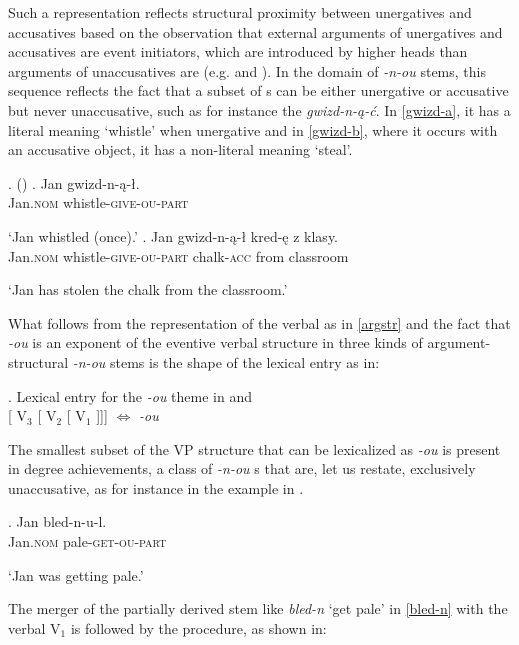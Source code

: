 Such a representation reflects structural proximity between unergatives and accusatives based on the observation that external arguments of unergatives and accusatives  are event initiators, which are introduced by higher heads than arguments of unaccusatives are (e.g. \citealt{LevinandRapp1995} and \citealt{Ramchand08}). In the domain of \textit{-n-ou} stems, this sequence reflects the fact that a subset of s can be either unergative or accusative but never unaccusative, such as for instance the  \textit{gwizd-n-\k{a}-\'c}. In \ref{gwizd-a}, it has a literal meaning `whistle' when unergative and in \ref{gwizd-b}, where it occurs with an accusative object, it has a non-literal meaning `steal'.

\ex.  (\citealt[ex. 89]{NU})
\ag. Jan gwizd-n-\k{a}-\l.\\
Jan.\textsc{nom} whistle-\textsc{give}-\textsc{ou}-\textsc{part}\\
\strut `Jan whistled (once).'\label{gwizd-a}
\bg. Jan {gwizd-n-\k{a}-\l}  kred-\k{e} z klasy.\\
Jan.\textsc{nom} {whistle-\textsc{give}-\textsc{ou}-\textsc{part}}  chalk-\textsc{acc} from classroom\\
\strut `Jan has stolen the chalk from the classroom.'\label{gwizd-b}

What follows from the representation of the verbal  as in \ref{argstr} and the fact that \textit{-ou} is an exponent of the eventive verbal structure in three kinds of argument-structural \textit{-n-ou} stems is the shape of the lexical entry as in:

\ex. Lexical entry for the \textit{-ou} theme in  and \label{lex:ou}\\[0.5ex]
[ V$_{3}$ [ V$_{2}$ [ V$_{1}$ ]]]  $\Leftrightarrow$ \textit{-ou}

\noindent
The smallest subset of the VP structure that can be lexicalized as \textit{-ou} is present in degree achievements, a class of \textit{-n-ou} s that are, let us restate, exclusively unaccusative, as for instance in the  example in \Next.

\exg. 
Jan bled-n-u-l.\\
Jan.\textsc{nom} pale-\textsc{get}-\textsc{ou}-\textsc{part}\\
\strut `Jan was getting pale.'

The merger of the partially derived   stem like \textit{bled-n} `get pale' in \ref{bled-n} with the verbal  V$_{1}$ is followed by the  procedure, as shown in:


